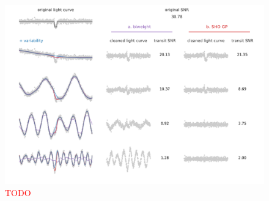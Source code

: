 \documentclass{aastex631}
\newcommand{\TODO}{\textcolor{red}{TODO}}
\begin{document}
\begin{figure}[H]
    \begin{centering}
        \includegraphics[width=\linewidth]{../figures/issue2.pdf}
        \caption{\TODO}
        \label{fig:issue2}
    \end{centering}
\end{figure}
\end{document}
